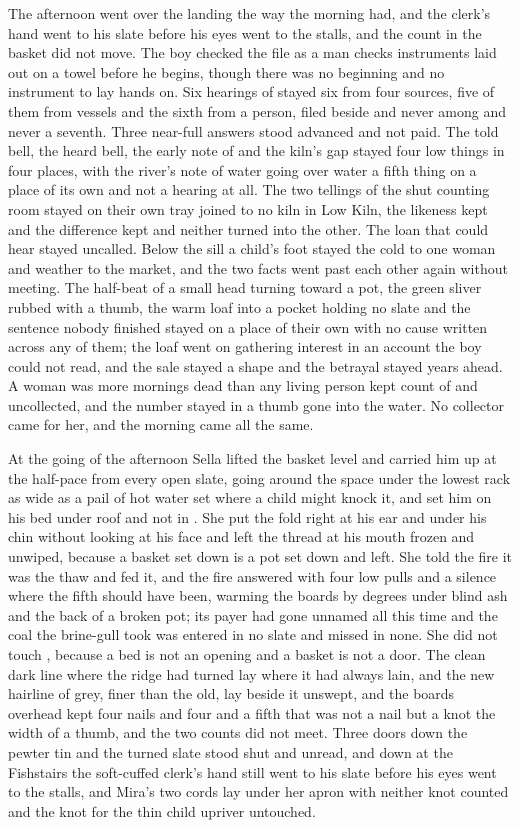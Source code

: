 The afternoon went over the landing the way the morning had, and the clerk's hand went to his slate before his eyes went to the stalls, and the count in the basket did not move. The boy checked the file as a man checks instruments laid out on a towel before he begins, though there was no beginning and no instrument to lay hands on. Six hearings of  stayed six from four sources, five of them from vessels and the sixth from a person, filed beside and never among and never a seventh. Three near-full answers stood advanced and not paid. The told bell, the heard bell, the early note of  and the kiln's gap stayed four low things in four places, with the river's note of water going over water a fifth thing on a place of its own and not a hearing at all. The two tellings of the shut counting room stayed on their own tray joined to no kiln in Low Kiln, the likeness kept and the difference kept and neither turned into the other. The loan that could hear stayed uncalled. Below the sill a child's foot stayed the cold to one woman and weather to the market, and the two facts went past each other again without meeting. The half-beat of a small head turning toward a pot, the green sliver rubbed with a thumb, the warm loaf into a pocket holding no slate and the sentence nobody finished stayed on a place of their own with no cause written across any of them; the loaf went on gathering interest in an account the boy could not read, and the sale stayed a shape and the betrayal stayed years ahead. A woman was more mornings dead than any living person kept count of and uncollected, and the number stayed in a thumb gone into the water. No collector came for her, and the morning came all the same.

At the going of the afternoon Sella lifted the basket level and carried him up at the half-pace from every open slate, going around the space under the lowest rack as wide as a pail of hot water set where a child might knock it, and set him on his bed under  roof and not in . She put the fold right at his ear and under his chin without looking at his face and left the thread at his mouth frozen and unwiped, because a basket set down is a pot set down and left. She told the fire it was the thaw and fed it, and the fire answered with four low pulls and a silence where the fifth should have been, warming the boards by degrees under blind ash and the back of a broken pot; its payer had gone unnamed all this time and the coal the brine-gull took was entered in no slate and missed in none. She did not touch , because a bed is not an opening and a basket is not a door. The clean dark line where the  ridge had turned lay where it had always lain, and the new hairline of grey, finer than the old, lay beside it unswept, and the boards overhead kept four nails and four and a fifth that was not a nail but a knot the width of a thumb, and the two counts did not meet. Three doors down the pewter tin and the turned slate stood shut and unread, and down at the Fishstairs the soft-cuffed clerk's hand still went to his slate before his eyes went to the stalls, and Mira's two cords lay under her apron with neither knot counted and the knot for the thin child upriver untouched.

